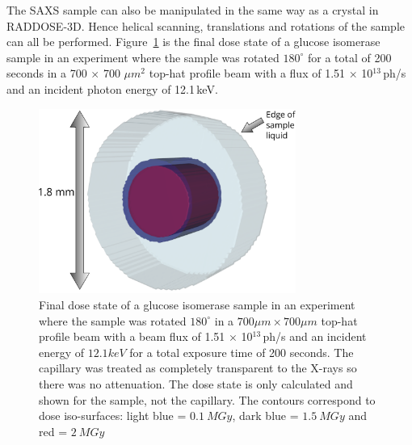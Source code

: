 The SAXS sample can also be manipulated in the same way as a crystal in RADDOSE-3D.
Hence helical scanning, translations and rotations of the sample can all be performed.
Figure~\ref{fig:SAXS cylinder rotated} is the final dose state of a glucose isomerase sample in an experiment where the sample was rotated $180^{\circ}$ for a total of 200 seconds in a 700 $\times$ 700 $\mu m^{\text{2}}$ top-hat profile beam with a flux of 1.51 $\times$ 10$^{\text{13}}\,$ph/s and an incident photon energy of 12.1$\,$keV.
\begin{figure}
    \centering
    \includegraphics[width=0.75\textwidth]{figures/saxs/SAXScylinder.pdf}
    \caption[RADDOSE-3D dose contour plot of a cylindrical SAXS sample.]{Final dose state of a glucose isomerase sample in an experiment where the sample was rotated $180^{\circ}$ in a $ 700 \mu m \times 700 \mu m $ top-hat profile beam with a beam flux of 1.51 $\times$ 10$^{\text{13}}\,$ph/s and an incident energy of $ 12.1 keV $ for a total exposure time of 200 seconds.
    The capillary was treated as completely transparent to the X-rays so there was no attenuation.
    The dose state is only calculated and shown for the sample, not the capillary.
    The contours correspond to dose iso-surfaces: light blue = $ 0.1\ MGy $, dark blue = $ 1.5\ MGy $ and red = $ 2\ MGy $ }
    \label{fig:SAXS cylinder rotated}
\end{figure}
